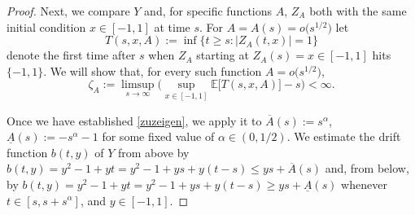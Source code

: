 \documentclass[10pt,a4paper]{amsart}
\def\E{\mathbb E}
\renewcommand{\bar}{\overline}
\begin{document}
\begin{proof}
Next, we compare  $Y$ and, for specific functions $A$, $Z_A$  both with the same initial condition $x\in [-1,1]$ at time $s$.
For $A=A(s)=o\big(s^{1/2}\big)$ let
$$
T(s,x,A):=\inf\{t \geq s: |Z_A(t,x)|=1\}
$$ denote the first time after $s$ when  $Z_A$ starting at $Z_A(s)=x\in[-1,1]$ hits $\{-1,1\}$. We will show that, for every such function $A=o\big(s^{1/2}\big)$,
\begin{equation}\label{zuzeigen}
  \zeta_A:=\limsup_{s \to \infty}\Big(\sup_{x \in [-1,1]}\E \big[T(s,x,A)\big]-s\Big)<\infty.
\end{equation}

Once we have established \eqref{zuzeigen}, we apply it to 
$\bar A(s):=s^\alpha$, $\underline A(s):=-s^\alpha-1 $ for some fixed value of $\alpha \in (0,1/2)$.  We estimate the drift function $b(t,y)$ of $Y$ from above
by $b(t,y)=y^2-1+yt= y^2-1+ys+y(t-s) \leq ys + \bar A(s)$ %
and, from below, by $b(t,y)=y^2-1+yt= y^2-1+ys+y(t-s) \geq ys + \underline A(s)$ whenever $t \in [s,s+s^\alpha]$, and $y \in [-1,1]$.


\end{proof}
\end{document}
